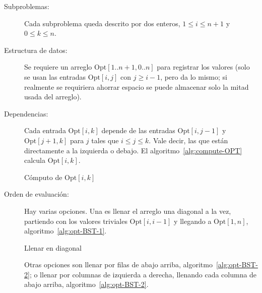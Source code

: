   \begin{description}
  \item[Subproblemas:]
    Cada subproblema queda descrito por dos enteros,
    \(1 \le i \le n + 1\) y \(0 \le k \le n\).
  \item[Estructura de datos:]
    Se requiere un arreglo \(\mathrm{Opt}[1 .. n + 1, 0 .. n]\)
    para registrar los valores
    (solo se usan las entradas \(\mathrm{Opt}[i, j]\)
     con \(j \ge i - 1\),
     pero da lo mismo;
     si realmente se requiriera ahorrar espacio
     se puede almacenar solo la mitad usada del arreglo).
   \item[Dependencias:]
     Cada entrada \(\mathrm{Opt}[i, k]\)
     depende de las entradas \(\mathrm{Opt}[i, j - 1]\)
     y \(\mathrm{Opt}[j + 1, k]\)
     para \(j\) tales que \(i \le j \le k\).
     Vale decir,
     las que están directamente a la izquierda o debajo.
     El algoritmo~\ref{alg:compute-OPT} calcula \(\mathrm{Opt}[i, k]\).
     \begin{algorithm}
       \DontPrintSemicolon\Indp

       \caption{Cómputo de \(\mathrm{Opt}[i, k]\)}
       \label{alg:compute-OPT}
     \end{algorithm}
   \item[Orden de evaluación:]
     Hay varias opciones.
     Una es llenar el arreglo una diagonal a la vez,
     partiendo con los valores triviales \(\mathrm{Opt}[i, i - 1]\)
     y llegando a \(\mathrm{Opt}[1, n]\),
     algoritmo~\ref{alg:opt-BST-1}.
     \begin{algorithm}
       \DontPrintSemicolon\Indp


       \caption{Llenar en diagonal}
       \label{alg:opt-BST-1}
     \end{algorithm}
     Otras opciones son llenar por filas de abajo arriba,
     algoritmo~\ref{alg:opt-BST-2};
     o llenar por columnas de izquierda a derecha,
     llenando cada columna de abajo arriba,
     algoritmo~\ref{alg:opt-BST-2}.
     \begin{algorithm}
       \DontPrintSemicolon\Indp


\end{algorithm}
\end{description}
